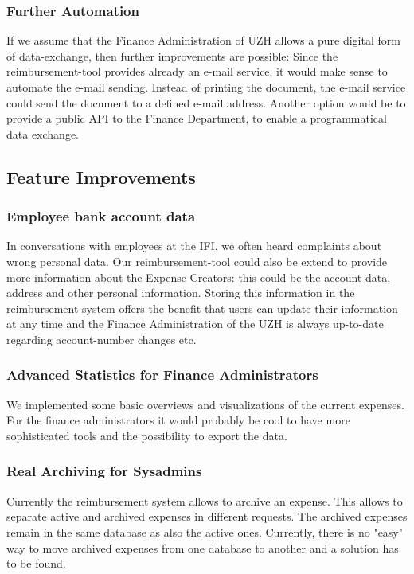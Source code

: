 \subsubsection{Further Automation}
If we assume that the Finance Administration of UZH allows a pure digital form of data-exchange, then further improvements are possible: Since the reimbursement-tool provides already an e-mail service, it would make sense to automate the e-mail sending. Instead of printing the document, the e-mail service could send the document to a defined e-mail address. Another option would be to provide a public API to the Finance Department, to enable a programmatical data exchange.\par 

\subsection{Feature Improvements}
\subsubsection{Employee bank account data}
In conversations with employees at the IFI, we often heard complaints about wrong personal data. Our reimbursement-tool could also be extend to provide more information about the Expense Creators: this could be the account data, address and other personal information. Storing this information in the reimbursement system offers the benefit that users can update their information at any time and the Finance Administration of the UZH is always up-to-date regarding account-number changes etc.

\subsubsection{Advanced Statistics for Finance Administrators } 
We implemented some basic overviews and visualizations of the current expenses. For the finance administrators it would probably be cool to have more sophisticated tools and the possibility to export the data.

\subsubsection{Real Archiving for Sysadmins} 
Currently the reimbursement system allows to archive an expense. This allows to separate active and archived expenses in different requests. The archived expenses remain in the same database as also the active ones. Currently, there is no "easy" way to move archived expenses from one database to another and a solution has to be found.
